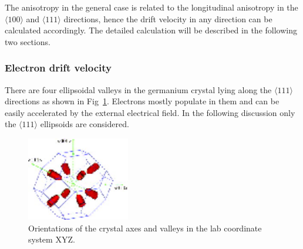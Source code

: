 The anisotropy in the general case is related to the longitudinal anisotropy in the $\langle100\rangle$ and $\langle111\rangle$ directions, hence the drift velocity in any direction can be calculated accordingly. The detailed calculation will be described in the following two sections.

\subsubsection{Electron drift velocity}
\label{sec:elec}
There are four ellipsoidal valleys in the germanium crystal lying along the $\langle111\rangle$ directions as shown in Fig~\ref{fig:valley}. Electrons mostly populate in them and can be easily accelerated by the external electrical field. In the following discussion only the $\langle111\rangle$ ellipsoids are considered.
\begin{figure}[tbhp]
  \centering
  \includegraphics[width=0.4\textwidth]{valleys.eps}  
  \caption{Orientations of the crystal axes and valleys in the lab coordinate system XYZ.}
  \label{fig:valley}
\end{figure}

